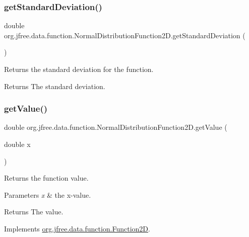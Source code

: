\subsubsection{\texorpdfstring{get\+Standard\+Deviation()}{getStandardDeviation()}}
{\footnotesize\ttfamily double org.\+jfree.\+data.\+function.\+Normal\+Distribution\+Function2\+D.\+get\+Standard\+Deviation (\begin{DoxyParamCaption}{ }\end{DoxyParamCaption})}

Returns the standard deviation for the function.

\begin{DoxyReturn}{Returns}
The standard deviation. 
\end{DoxyReturn}
\mbox{\label{classorg_1_1jfree_1_1data_1_1function_1_1_normal_distribution_function2_d_ae9a646904dcbaaa779ee1426612613dd}} 
\subsubsection{\texorpdfstring{get\+Value()}{getValue()}}
{\footnotesize\ttfamily double org.\+jfree.\+data.\+function.\+Normal\+Distribution\+Function2\+D.\+get\+Value (\begin{DoxyParamCaption}\item[{double}]{x }\end{DoxyParamCaption})}

Returns the function value.


\begin{DoxyParams}{Parameters}
{\em x} & the x-\/value.\\
\hline
\end{DoxyParams}
\begin{DoxyReturn}{Returns}
The value. 
\end{DoxyReturn}


Implements \mbox{\hyperlink{interfaceorg_1_1jfree_1_1data_1_1function_1_1_function2_d_a0f925a1dfe40f894d7f763f39320db22}{org.\+jfree.\+data.\+function.\+Function2D}}.

\mbox{\label{classorg_1_1jfree_1_1data_1_1function_1_1_normal_distribution_function2_d_a2d8b1c62d83d213ed18baa6eaf96b1df}} 
